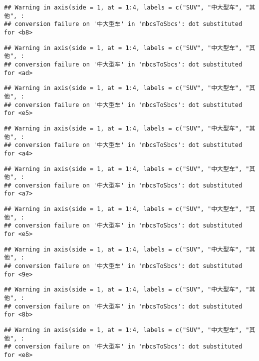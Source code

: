 \documentclass[]{article}
\begin{document}
\begin{verbatim}
## Warning in axis(side = 1, at = 1:4, labels = c("SUV", "中大型车", "其他", :
## conversion failure on '中大型车' in 'mbcsToSbcs': dot substituted for <b8>
\end{verbatim}

\begin{verbatim}
## Warning in axis(side = 1, at = 1:4, labels = c("SUV", "中大型车", "其他", :
## conversion failure on '中大型车' in 'mbcsToSbcs': dot substituted for <ad>
\end{verbatim}

\begin{verbatim}
## Warning in axis(side = 1, at = 1:4, labels = c("SUV", "中大型车", "其他", :
## conversion failure on '中大型车' in 'mbcsToSbcs': dot substituted for <e5>
\end{verbatim}

\begin{verbatim}
## Warning in axis(side = 1, at = 1:4, labels = c("SUV", "中大型车", "其他", :
## conversion failure on '中大型车' in 'mbcsToSbcs': dot substituted for <a4>
\end{verbatim}

\begin{verbatim}
## Warning in axis(side = 1, at = 1:4, labels = c("SUV", "中大型车", "其他", :
## conversion failure on '中大型车' in 'mbcsToSbcs': dot substituted for <a7>
\end{verbatim}

\begin{verbatim}
## Warning in axis(side = 1, at = 1:4, labels = c("SUV", "中大型车", "其他", :
## conversion failure on '中大型车' in 'mbcsToSbcs': dot substituted for <e5>
\end{verbatim}

\begin{verbatim}
## Warning in axis(side = 1, at = 1:4, labels = c("SUV", "中大型车", "其他", :
## conversion failure on '中大型车' in 'mbcsToSbcs': dot substituted for <9e>
\end{verbatim}

\begin{verbatim}
## Warning in axis(side = 1, at = 1:4, labels = c("SUV", "中大型车", "其他", :
## conversion failure on '中大型车' in 'mbcsToSbcs': dot substituted for <8b>
\end{verbatim}

\begin{verbatim}
## Warning in axis(side = 1, at = 1:4, labels = c("SUV", "中大型车", "其他", :
## conversion failure on '中大型车' in 'mbcsToSbcs': dot substituted for <e8>
\end{verbatim}
\end{document}
